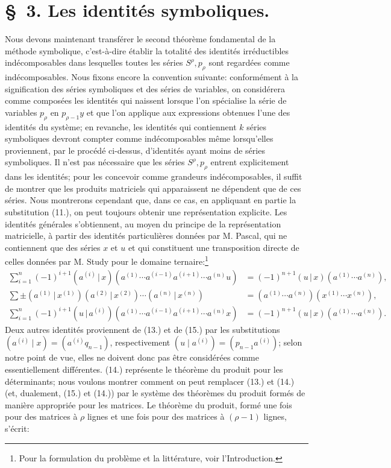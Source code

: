 \documentclass[11pt]{article}
\newcommand{\pair}[2]{(#1\,|\,#2)}
\begin{document}
\section*{\S\ 3. Les identités symboliques.}
Nous devons maintenant transférer le second théorème fondamental de la méthode symbolique, c'est-à-dire établir la totalité des identités irréductibles indécomposables dans lesquelles toutes les séries $S^\rho,p_\rho$ sont regardées comme indécomposables. Nous fixons encore la convention suivante: conformément à la signification des séries symboliques et des séries de variables, on considérera comme composées les identités qui naissent lorsque l'on spécialise la série de variables $p_\rho$ en $p_{\rho-1}y$ et que l'on applique aux expressions obtenues l'une des identités du système; en revanche, les identités qui contiennent $k$ séries symboliques devront compter comme indécomposables même lorsqu'elles proviennent, par le procédé ci-dessus, d'identités ayant moins de séries symboliques. Il n'est pas nécessaire que les séries $S^\rho,p_\rho$ entrent explicitement dans les identités; pour les concevoir comme grandeurs indécomposables, il suffit de montrer que les produits matriciels qui apparaissent ne dépendent que de ces séries. Nous montrerons cependant que, dans ce cas, en appliquant en partie la substitution (11.), on peut toujours obtenir une représentation explicite. Les identités générales s'obtiennent, au moyen du principe de la représentation matricielle, à partir des identités particulières données par M. Pascal, qui ne contiennent que des séries $x$ et $u$ et qui constituent une transposition directe de celles données par M. Study pour le domaine ternaire:\footnote{Pour la formulation du problème et la littérature, voir l'Introduction.}
\begin{align}
\sum_{i=1}^n(-1)^{i+1}\pair{a^{(i)}}{x}(a^{(1)}\cdots a^{(i-1)}a^{(i+1)}\cdots a^{(n)}u)&=(-1)^{n+1}\pair{u}{x}(a^{(1)}\cdots a^{(n)}),\tag{13}\\
\sum\pm\pair{a^{(1)}}{x^{(1)}}\pair{a^{(2)}}{x^{(2)}}\cdots\pair{a^{(n)}}{x^{(n)}}&=(a^{(1)}\cdots a^{(n)})(x^{(1)}\cdots x^{(n)}),\tag{14}\\
\sum_{i=1}^n(-1)^{i+1}\pair{u}{a^{(i)}}(a^{(1)}\cdots a^{(i-1)}a^{(i+1)}\cdots a^{(n)}x)&=(-1)^{n+1}\pair{u}{x}(a^{(1)}\cdots a^{(n)}).\tag{15}
\end{align}
Deux autres identités proviennent de (13.) et de (15.) par les substitutions $(a^{(i)}\mid x)=(a^{(i)}q_{n-1})$, respectivement $(u\mid a^{(i)})=(p_{n-1}a^{(i)})$; selon notre point de vue, elles ne doivent donc pas être considérées comme essentiellement différentes. (14.) représente le théorème du produit pour les déterminants; nous voulons montrer comment on peut remplacer (13.) et (14.) (et, dualement, (15.) et (14.)) par le système des théorèmes du produit formés de manière appropriée pour les matrices. Le théorème du produit, formé une fois pour des matrices à $\rho$ lignes et une fois pour des matrices à $(\rho-1)$ lignes, s'écrit:
\end{document}
